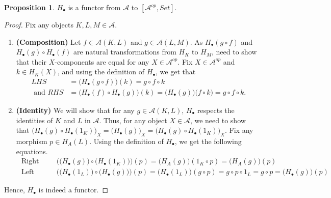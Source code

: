 \documentclass[18pt,a4paper]{article}
\theoremstyle{definition}
\newtheorem{proop}[theorem]{Proposition}
\begin{document}
	\begin{proop} $H_\bullet$ is a functor from $\mathcal{A}$ to $[\mathcal{A} ^{op},Set]$.
	\end{proop}
	\begin{proof}\setcounter{equation}{0}
		Fix any objects $K,L,M \in \mathcal{A} $.
		\begin{enumerate}[label=\Roman*]
			\item \textbf{ (Composition) }
				Let $f \in \mathcal{A} (K,L)$ and $g \in \mathcal{A} (L,M)$.
				As $H_\bullet(g \circ f)$ and $H_\bullet(g) \circ H_\bullet(f)$
				are natural transformations from $H_K$ to $H_M$,
			need to show that their	$X$-components are equal
			for any $X\in \mathcal{A} ^{op}$. Fix $X\in \mathcal{A} ^{op}$ and
			$k \in H_K(X)$,	and using the definition of $H_\bullet$, we get that
				\begin{align*}
					LHS&=\big( H_\bullet(g \circ f) \big) (k)=
					g\circ f \circ k \\
					\text{ and } RHS&=
					\Big( H_\bullet(f) \circ H_\bullet(g) \Big) (k)
					=\Big(H_\bullet(g)\Big) \big(f \circ k\big)
				=g\circ f \circ k. \end{align*}
			\item \textbf{ (Identity) } We will show that for any $g \in \mathcal{A} (K,L)$, $H_\bullet$
				respects the identities	of $K$ and $L$ in $\mathcal{A}$.
				Thus, for any object $X \in \mathcal{A} $, we need to show that
				$\Big( H_\bullet(g) \circ H_\bullet(1_K) \Big)_X = \Big( H_\bullet(g)\Big) _X
				=\Big( H_\bullet(g) \circ H_\bullet(1_K) \Big)_X $.
				Fix any morphism $p \in H_A(L)$.
				Using the definition of $H_\bullet$,
				we get the following equations.
				\begin{align*}
					\text{ Right Identity: }& \Big( \big( H_\bullet(g) \big) \circ \big( H_\bullet(1_K)
					\big) \Big)(p)
					=\big( H_A(g) \big) (1_K \circ p) =
					\big( H_A(g) \big) (p) \\
							\text{ Left Identity: }& \Big( \big( H_\bullet(1_L) \big) \circ \big( H_\bullet(g)\big) \Big)(p)
							=\big( H_\bullet(1_L) \big) (g \circ p) = g \circ p \circ 1_L=g \circ p
							= \big( H_\bullet(g) \big)(p)
						\end{align*}

			\end{enumerate}
			Hence, $H_\bullet$ is indeed a functor.
		\end{proof}
\end{document}

